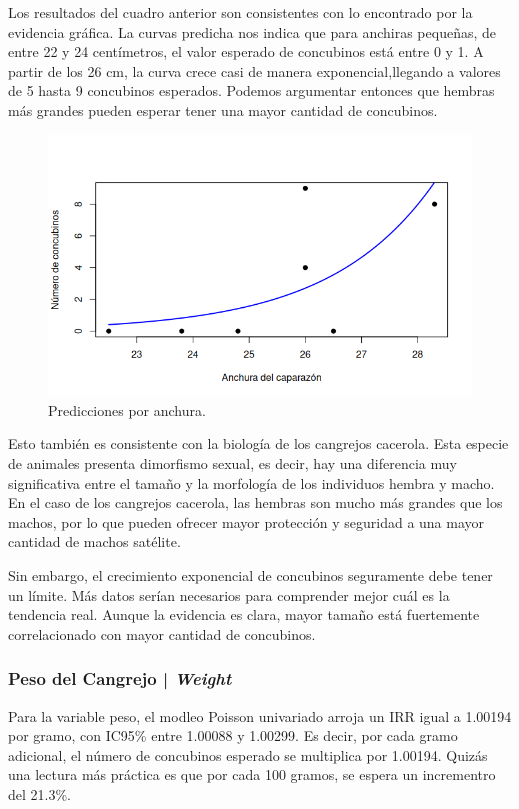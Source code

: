 Los resultados del cuadro anterior son consistentes con lo encontrado por la evidencia gráfica. La curvas
predicha nos indica que para anchiras pequeñas, de entre 22 y 24 centímetros, el valor esperado de
concubinos está entre 0 y 1. A partir de los 26 cm, la curva crece casi de manera exponencial,llegando a 
valores de 5 hasta 9 concubinos esperados. Podemos argumentar entonces que hembras más grandes
pueden esperar tener una mayor cantidad de concubinos. 

\begin{figure}[h!]
    \centering
    \includegraphics[width=0.7\linewidth]{Images/anchura-capa.png}
    \caption{Predicciones por anchura.}
    \label{fig:anchura-capa}
\end{figure}

Esto también es consistente con la biología de los cangrejos cacerola. Esta especie de animales presenta
dimorfismo sexual, es decir, hay una diferencia muy significativa entre el tamaño y la morfología de
los individuos hembra y macho. En el caso de los cangrejos cacerola, las hembras son mucho más grandes
que los machos, por lo que pueden ofrecer mayor protección y seguridad a una mayor cantidad de machos satélite.

Sin embargo, el crecimiento exponencial de concubinos seguramente debe tener un límite. Más datos serían
necesarios para comprender mejor cuál es la tendencia real. Aunque la evidencia es clara, mayor tamaño está
fuertemente correlacionado con mayor cantidad de concubinos. 

\subsubsection{Peso del Cangrejo | \textit{Weight}}

Para la variable peso, el modleo Poisson univariado arroja un IRR igual a 1.00194 por gramo, con IC95\%
entre 1.00088 y 1.00299. Es decir, por cada gramo adicional, el número de concubinos esperado se multiplica
por 1.00194. Quizás una lectura más práctica es que por cada 100 gramos, se espera un incrementro del
21.3\%.

